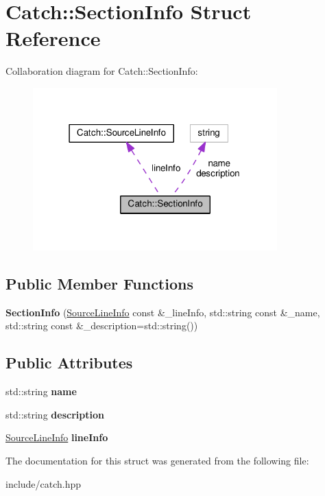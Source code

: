 \hypertarget{structCatch_1_1SectionInfo}{}\section{Catch\+:\+:Section\+Info Struct Reference}
\label{structCatch_1_1SectionInfo}


Collaboration diagram for Catch\+:\+:Section\+Info\+:
\nopagebreak
\begin{figure}[H]
\begin{center}
\leavevmode
\includegraphics[width=267pt]{structCatch_1_1SectionInfo__coll__graph}
\end{center}
\end{figure}
\subsection*{Public Member Functions}
\begin{DoxyCompactItemize}
\item 
{\bfseries Section\+Info} (\hyperlink{structCatch_1_1SourceLineInfo}{Source\+Line\+Info} const \&\+\_\+line\+Info, std\+::string const \&\+\_\+name, std\+::string const \&\+\_\+description=std\+::string())\hypertarget{structCatch_1_1SectionInfo_a27aff3aaf8b6611f3651b17111a272c6}{}\label{structCatch_1_1SectionInfo_a27aff3aaf8b6611f3651b17111a272c6}

\end{DoxyCompactItemize}
\subsection*{Public Attributes}
\begin{DoxyCompactItemize}
\item 
std\+::string {\bfseries name}\hypertarget{structCatch_1_1SectionInfo_a704c8fc662d309137e0d4f199cb7df58}{}\label{structCatch_1_1SectionInfo_a704c8fc662d309137e0d4f199cb7df58}

\item 
std\+::string {\bfseries description}\hypertarget{structCatch_1_1SectionInfo_a0052060219a6de74bb7ade34d4163a4e}{}\label{structCatch_1_1SectionInfo_a0052060219a6de74bb7ade34d4163a4e}

\item 
\hyperlink{structCatch_1_1SourceLineInfo}{Source\+Line\+Info} {\bfseries line\+Info}\hypertarget{structCatch_1_1SectionInfo_adbc83b8a3507c4acc8ee249e93465711}{}\label{structCatch_1_1SectionInfo_adbc83b8a3507c4acc8ee249e93465711}

\end{DoxyCompactItemize}


The documentation for this struct was generated from the following file\+:\begin{DoxyCompactItemize}
\item 
include/catch.\+hpp\end{DoxyCompactItemize}
